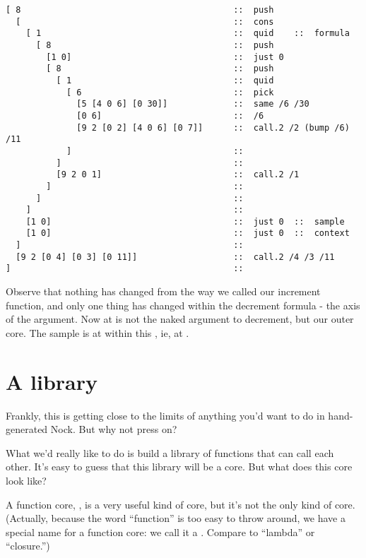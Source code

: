 \begin{framed_shaded}
\begin{Verbatim}[fontsize=\relsize{-2.5},fontseries=b,commandchars=\\\{\}]
[ 8                                          ::  push
  [                                          ::  cons
    [ 1                                      ::  quid    ::  formula
      [ 8                                    ::  push
        [1 0]                                ::  just 0
        [ 8                                  ::  push
          [ 1                                ::  quid
            [ 6                              ::  pick
              [5 [4 0 6] [0 30]]             ::  same /6 /30
              [0 6]                          ::  /6
              [9 2 [0 2] [4 0 6] [0 7]]      ::  call.2 /2 (bump /6) /11
            ]                                ::
          ]                                  ::
          [9 2 0 1]                          ::  call.2 /1
        ]                                    ::
      ]                                      ::
    ]                                        ::
    [1 0]                                    ::  just 0  ::  sample
    [1 0]                                    ::  just 0  ::  context
  ]                                          ::
  [9 2 [0 4] [0 3] [0 11]]                   ::  call.2 /4 /3 /11
]                                            ::
\end{Verbatim}
\end{framed_shaded}
Observe that nothing has changed from the way we called our
increment function, and only one thing has changed within the
decrement formula - the axis of the argument.  Now at  is not
the naked argument to decrement, but our outer core.  The sample
is at  within this , ie, at .

\section{A library}

Frankly, this is getting close to the limits of anything you'd
want to do in hand-generated Nock.  But why not press on?

What we'd really like to do is build a library of functions that
can call each other.  It's easy to guess that this library will
be a core.  But what does this core look like?

A function core, , is a very useful
kind of core, but it's not the only kind of core.  (Actually,
because the word ``function'' is too easy to throw around, we have
a special name for a function core: we call it a .  Compare
to ``lambda'' or ``closure.'')

